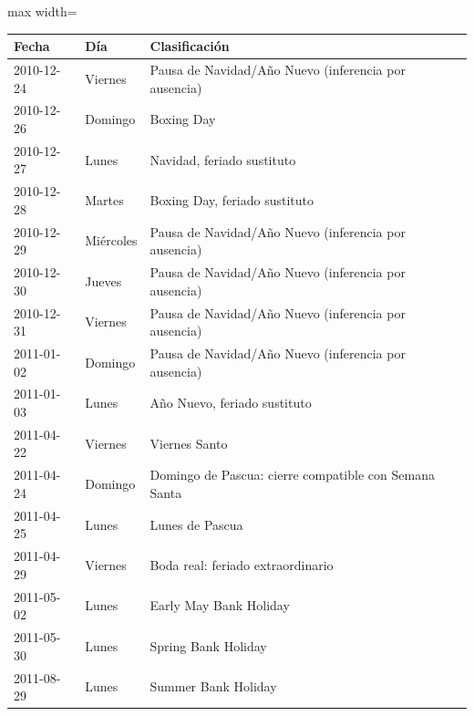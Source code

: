 \begin{center}\small\setlength{\tabcolsep}{4pt}
\begin{adjustbox}{max width=\textwidth}\begin{tabular}{llp{8cm}}
\toprule
Fecha & Día & Clasificación \\ \midrule
2010-12-24 & Viernes & Pausa de Navidad/Año Nuevo (inferencia por ausencia) \\
2010-12-26 & Domingo & Boxing Day \\
2010-12-27 & Lunes & Navidad, feriado sustituto \\
2010-12-28 & Martes & Boxing Day, feriado sustituto \\
2010-12-29 & Miércoles & Pausa de Navidad/Año Nuevo (inferencia por ausencia) \\
2010-12-30 & Jueves & Pausa de Navidad/Año Nuevo (inferencia por ausencia) \\
2010-12-31 & Viernes & Pausa de Navidad/Año Nuevo (inferencia por ausencia) \\
2011-01-02 & Domingo & Pausa de Navidad/Año Nuevo (inferencia por ausencia) \\
2011-01-03 & Lunes & Año Nuevo, feriado sustituto \\
2011-04-22 & Viernes & Viernes Santo \\
2011-04-24 & Domingo & Domingo de Pascua: cierre compatible con Semana Santa \\
2011-04-25 & Lunes & Lunes de Pascua \\
2011-04-29 & Viernes & Boda real: feriado extraordinario \\
2011-05-02 & Lunes & Early May Bank Holiday \\
2011-05-30 & Lunes & Spring Bank Holiday \\
2011-08-29 & Lunes & Summer Bank Holiday \\
\bottomrule\end{tabular}\end{adjustbox}\end{center}
